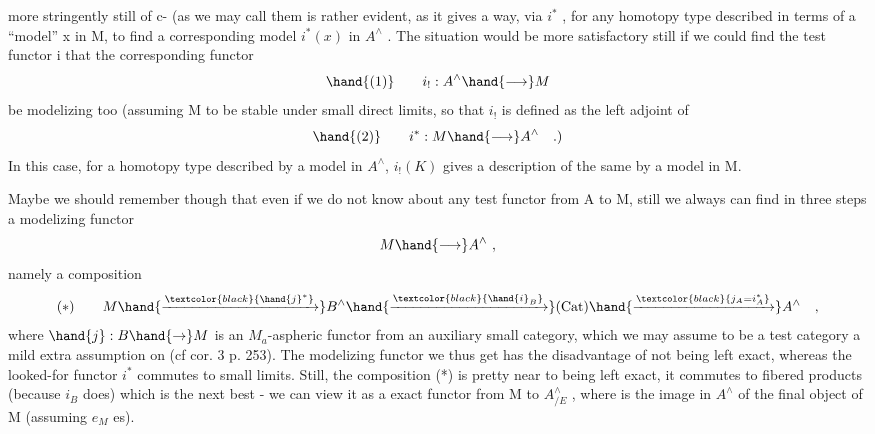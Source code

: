
more stringently still of c-\hand{\uline{\textcolor{black}{aspheric}}} \hand{\uline{\textcolor{black}{functors}}}(as we may call them is
rather evident,  as it gives a way,  via $i^{*}$ ,  for any homotopy type
described in terms of a ``model'' x in M,  to find a corresponding model
$i^{*}(x)$ in $A^{\wedge}$ .  The situation would be more satisfactory still if we 
could find the test functor i  that the corresponding functor
\[ \hand{(1)} \qquad i_{!} : A^{\wedge} \hand{\longrightarrow} M \]
be modelizing too  (assuming M to be stable under small direct limits,
so that $i_{!}$ is defined as the left adjoint of 
\[ \hand{(2)} \qquad i^{*} : M \hand{\longrightarrow} A^{\wedge} \quad .) \]
In this case,  for a homotopy type described by a model  in $A^{\wedge}$,
$i_{!}(K)$  gives a description of the same by a model in M.

Maybe we should remember though that even if we do not know about
any test functor from A to M,  still we always can find in three steps
a modelizing functor
\[ M \hand{\longrightarrow} A^{\wedge} \ , \]
namely a composition
\[ (*) \qquad M \hand{\xrightarrow{\textcolor{black}{\hand{j}^{*}}}} B^{\wedge} \hand{\xrightarrow{\textcolor{black}{\hand{i}_{B}}}} (\mathrm{Cat}) \hand{\xrightarrow{\textcolor{black}{j_{A} = i_{A}^{*}}}} A^{\wedge} \quad , \]
where  $\hand{j}: B \hand{\to} M$  is an $M_{a}$-aspheric functor from an auxiliary small
category,  which  we may assume to be a  test category\hand{,} 
 a mild extra assumption on  (cf cor. 3  p. 253).  The modelizing
functor we thus get has  the disadvantage of not being left exact,
whereas the looked-for functor $i^{*}$ commutes to small  limits.
Still,  the composition (*)  is pretty near to being left exact,  it
commutes to fibered products (because $i_{B}$  does)  which is the next best
-  we can view it as a  exact functor from  M  to  $A^{\wedge}_{/E}$ ,  where  is
the image in $A^{\wedge}$ of the final object of M (assuming  $e_{M}$ es).

